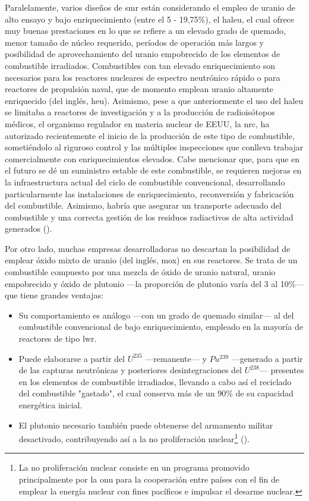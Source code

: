 Paralelamente, varios diseños de \acrshort{smr} están considerando el empleo de uranio de alto ensayo y bajo enriquecimiento (entre el 5 - 19,75\%), el \acrfull{haleu}, el cual ofrece muy buenas prestaciones en lo que se refiere a un elevado grado de quemado, menor tamaño de núcleo requerido, períodos de operación más largos y posibilidad de aprovechamiento del uranio empobrecido de los elementos de combustible irradiados. Combustibles con tan elevado enriquecimiento son necesarios para los reactores nucleares de espectro neutrónico rápido o para reactores de propulsión naval, que de momento emplean uranio altamente enriquecido (del inglés, \acrshort{heu}). Asimismo, pese a que anteriormente el uso del \acrshort{haleu} se limitaba a reactores de investigación y a la producción de radioisótopos médicos, el organismo regulador en materia nuclear de EEUU, la \acrfull{nrc}, ha autorizado recientemente el inicio de la producción de este tipo de combustible, sometiéndolo al riguroso control y las múltiples inspecciones que conlleva trabajar comercialmente con enriquecimientos elevados.  Cabe mencionar que, para que en el futuro se dé un suministro estable de este combustible, se requieren mejoras en la infraestructura actual del ciclo de combustible convencional, desarrollando particularmente las instalaciones de enriquecimiento, reconversión y fabricación del combustible. Asimismo, habría que asegurar un transporte adecuado del combustible y una correcta gestión de los residuos radiactivos de alta actividad generados (\cite{nrc_haleu}). 

Por otro lado, muchas empresas desarrolladoras no descartan la posibilidad de emplear óxido mixto de uranio (del inglés, \acrshort{mox}) en sus reactores. Se trata de un combustible compuesto por una mezcla de óxido de uranio natural, uranio empobrecido y óxido de plutonio ---la proporción de plutonio varía del 3 al 10\%--- que tiene grandes ventajas:

\begin{itemize}
  \item Su comportamiento es análogo ---con un grado de quemado similar--- al del combustible convencional de bajo enriquecimiento, empleado en la mayoría de reactores de tipo \acrshort{lwr}.
  \item Puede elaborarse a partir del $U^{235}$ ---remanente--- y $Pu^{239}$ ---generado a partir de las capturas neutrónicas y posteriores desintegraciones del $U^{238}$--- presentes en los elementos de combustible irradiados, llevando a cabo así el reciclado del combustible "gastado", el cual conserva más de un 90\% de su capacidad energética inicial. 
  \item El plutonio necesario también puede obtenerse del armamento militar desactivado, contribuyendo así a la \gls{no prolifera}ción nuclear\footnote{La no proliferación nuclear consiste en un programa promovido principalmente por la \acrshort{onu} para la cooperación entre países con el fin de emplear la energía nuclear con fines pacíficos e impulsar el desarme nuclear.} (\cite{wna_mox}).
\end{itemize}

